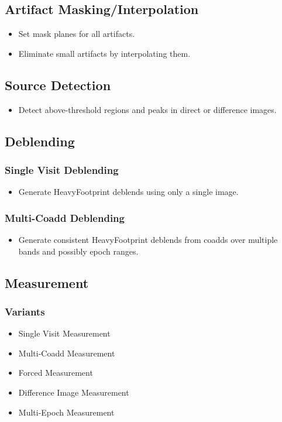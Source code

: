 \subsection{Artifact Masking/Interpolation}
\begin{itemize}
\item Set mask planes for all artifacts.
\item Eliminate small artifacts by interpolating them.
\end{itemize}

\subsection{Source Detection}
\begin{itemize}
\item Detect above-threshold regions and peaks in direct or difference images.
\end{itemize}

\subsection{Deblending}
\subsubsection{Single Visit Deblending}
\begin{itemize}
\item Generate HeavyFootprint deblends using only a single image.
\end{itemize}
\subsubsection{Multi-Coadd Deblending}
\begin{itemize}
\item Generate consistent HeavyFootprint deblends from coadds over multiple bands and possibly epoch ranges.
\end{itemize}

\subsection{Measurement}
\subsubsection{Variants}
\begin{itemize}
\item Single Visit Measurement
\item Multi-Coadd Measurement
\item Forced Measurement
\item Difference Image Measurement
\item Multi-Epoch Measurement
\end{itemize}

